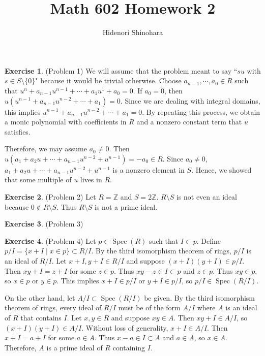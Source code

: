 \documentclass[12pt, psamsfonts]{amsart}
\theoremstyle{definition}
\newtheorem*{exer}{Exercise}
\theoremstyle{remark}
\DeclareMathOperator{\Spec}{Spec}
\numberwithin{equation}{section}
\begin{document}
\title{Math 602 Homework 2}
\author{Hidenori Shinohara}
\maketitle

\begin{exer}{(Problem 1)}
  We will assume that the problem meant to say ``$su$ with $s \in S \setminus \{ 0 \}$" because it would be trivial otherwise.
  Choose $a_{n - 1}, \cdots, a_0 \in R$ such that $u^n + a_{n - 1}u^{n - 1} + \cdots + a_1u^1 + a_0 = 0$.
  If $a_0 = 0$, then $u(u^{n - 1} + a_{n - 1}u^{n - 2} + \cdots + a_1) = 0$.
  Since we are dealing with integral domains, this implies $u^{n - 1} + a_{n - 1}u^{n - 2} + \cdots + a_1 = 0$.
  By repeating this process, we obtain a monic polynomial with coefficients in $R$ and a nonzero constant term that $u$ satisfies.

  Therefore, we may assume $a_0 \ne 0$.
  Then $u(a_1 + a_2u + \cdots + a_{n - 1}u^{n - 2} + u^{n - 1}) = -a_0 \in R$.
  Since $a_0 \ne 0$, $a_1 + a_2u + \cdots + a_{n - 1}u^{n - 2} + u^{n - 1}$ is a nonzero element in $S$.
  Hence, we showed that some multiple of $u$ lives in $R$.
\end{exer}

\begin{exer}{(Problem 2)}
  Let $R = \mathbb{Z}$ and $S = 2\mathbb{Z}$.
  $R \setminus S$ is not even an ideal because $0 \notin R \setminus S$.
  Thus $R \setminus S$ is not a prime ideal.
\end{exer}

\begin{exer}{(Problem 3)}
\end{exer}

\begin{exer}{(Problem 4)}
  Let $p \in \Spec(R)$ such that $I \subset p$.
  Define $p / I = \{ x + I \mid x \in p \} \subset R / I$.
  By the third isomorphism theorem of rings, $p / I$ is an ideal of $R / I$.
  Let $x + I, y + I \in R / I$ and suppose $(x + I)(y + I) \in p / I$.
  Then $xy + I = z + I$ for some $z \in p$.
  Thus $xy - z \in I \subset p$ and $z \in p$.
  Thus $xy \in p$, so $x \in p$ or $y \in p$.
  This implies $x + I \in p / I$ or $y + I \in p / I$, so $p / I \in \Spec(R / I)$.

  On the other hand, let $A / I \subset \Spec(R / I)$ be given.
  By the third isomorphism theorem of rings, every ideal of $R / I$ must be of the form $A / I$ where $A$ is an ideal of $R$ that contains $I$.
  Let $x, y \in R$ and suppose $xy \in A$.
  Then $xy + I \in A / I$, so $(x + I)(y + I) \in A / I$.
  Without loss of generality, $x + I \in A / I$.
  Then $x + I = a + I$ for some $a \in A$.
  Thus $x - a \in I \subset A$ and $a \in A$, so $x \in A$.
  Therefore, $A$ is a prime ideal of $R$ containing $I$.
\end{exer}
\end{document}
